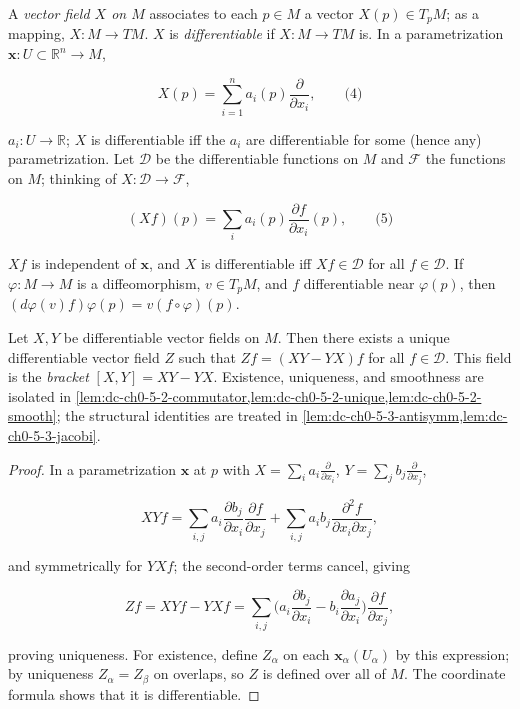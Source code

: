 \begin{definition}
  \label{def:dc-ch0-5-1}
  \leanok
  A \emph{vector field $X$ on $M$} associates to each $p\in M$ a vector $X(p)\in T_pM$;
  as a mapping, $X:M\to TM$. $X$ is \emph{differentiable} if $X:M\to TM$
  is. In a parametrization $\mathbf{x}:U\subset\mathbb{R}^n\to M$,
  
  $$
  X(p)=\sum_{i=1}^n a_i(p)\frac{\partial}{\partial x_i},\qquad\text{(4)}
  $$
  
  $a_i:U\to\mathbb{R}$; $X$ is differentiable iff the $a_i$ are differentiable for
  some (hence any) parametrization. Let $\mathcal{D}$ be the differentiable
  functions on $M$ and $\mathcal{F}$ the functions on $M$; thinking of
  $X:\mathcal{D}\to\mathcal{F}$,
  
  $$
  (Xf)(p)=\sum_i a_i(p)\frac{\partial f}{\partial x_i}(p),\qquad\text{(5)}
  $$
  
  $Xf$ is independent of $\mathbf{x}$, and $X$ is differentiable iff
  $Xf\in\mathcal{D}$ for all $f\in\mathcal{D}$. If $\varphi:M\to M$ is a
  diffeomorphism, $v\in T_pM$, and $f$ differentiable near $\varphi(p)$, then
  $(d\varphi(v)f)\varphi(p)=v(f\circ\varphi)(p)$.
\end{definition}

\begin{lemma}
  \label{lem:dc-ch0-5-2}
  \leanok
  Let $X,Y$ be differentiable vector fields on $M$. Then there exists a unique
  differentiable vector field $Z$ such that $Zf=(XY-YX)f$ for all
  $f\in\mathcal{D}$. This field is the \emph{bracket} $[X,Y]=XY-YX$.
  Existence, uniqueness, and smoothness are isolated in
  \cref{lem:dc-ch0-5-2-commutator,lem:dc-ch0-5-2-unique,lem:dc-ch0-5-2-smooth};
  the structural identities are treated in \cref{lem:dc-ch0-5-3-antisymm,lem:dc-ch0-5-3-jacobi}.
\end{lemma}
\begin{proof}
  \sketch
  \leanok
  In a parametrization $\mathbf{x}$ at $p$ with
  $X=\sum_i a_i\frac{\partial}{\partial x_i}$,
  $Y=\sum_j b_j\frac{\partial}{\partial x_j}$,
  
  $$
  XYf=\sum_{i,j}a_i\frac{\partial b_j}{\partial x_i}\frac{\partial f}{\partial x_j}+\sum_{i,j}a_i b_j\frac{\partial^2 f}{\partial x_i\partial x_j},
  $$
  
  and symmetrically for $YXf$; the second-order terms cancel, giving
  
  $$
  Zf=XYf-YXf=\sum_{i,j}\Big(a_i\frac{\partial b_j}{\partial x_i}-b_i\frac{\partial a_j}{\partial x_i}\Big)\frac{\partial f}{\partial x_j},
  $$
  
  proving uniqueness. For existence, define $Z_\alpha$ on each
  $\mathbf{x}_\alpha(U_\alpha)$ by this expression; by uniqueness $Z_\alpha=Z_\beta$
  on overlaps, so $Z$ is defined over all of $M$. The coordinate formula shows
  that it is differentiable.
\end{proof}

